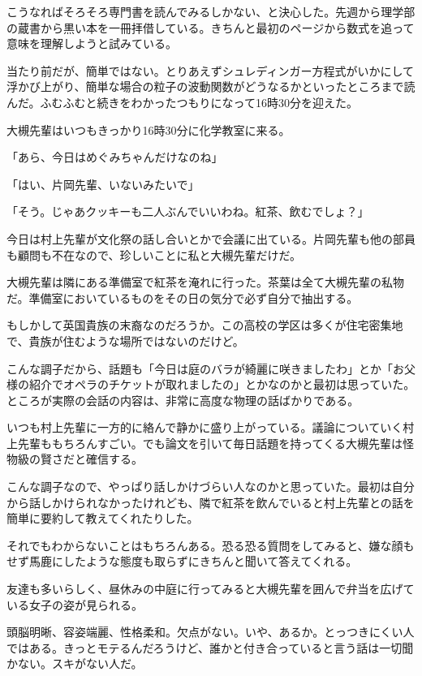 \documentclass[a4paper,dvipdfmx,12pt]{jsarticle}
\begin{document}
こうなればそろそろ専門書を読んでみるしかない、と決心した。先週から理学部の蔵書から黒い本を一冊拝借している。きちんと最初のページから数式を追って意味を理解しようと試みている。

当たり前だが、簡単ではない。とりあえずシュレディンガー方程式がいかにして浮かび上がり、簡単な場合の粒子の波動関数がどうなるかといったところまで読んだ。ふむふむと続きをわかったつもりになって16時30分を迎えた。

\vspace{0.2in}

大槻先輩はいつもきっかり16時30分に化学教室に来る。

「あら、今日はめぐみちゃんだけなのね」

「はい、片岡先輩、いないみたいで」

「そう。じゃあクッキーも二人ぶんでいいわね。紅茶、飲むでしょ？」

今日は村上先輩が文化祭の話し合いとかで会議に出ている。片岡先輩も他の部員も顧問も不在なので、珍しいことに私と大槻先輩だけだ。

\vspace{0.2in}

大槻先輩は隣にある準備室で紅茶を淹れに行った。茶葉は全て大槻先輩の私物だ。準備室においているものをその日の気分で必ず自分で抽出する。

もしかして英国貴族の末裔なのだろうか。この高校の学区は多くが住宅密集地で、貴族が住むような場所ではないのだけど。

こんな調子だから、話題も「今日は庭のバラが綺麗に咲きましたわ」とか「お父様の紹介でオペラのチケットが取れましたの」とかなのかと最初は思っていた。ところが実際の会話の内容は、非常に高度な物理の話ばかりである。

いつも村上先輩に一方的に絡んで静かに盛り上がっている。議論についていく村上先輩ももちろんすごい。でも論文を引いて毎日話題を持ってくる大槻先輩は怪物級の賢さだと確信する。

こんな調子なので、やっぱり話しかけづらい人なのかと思っていた。最初は自分から話しかけられなかったけれども、隣で紅茶を飲んでいると村上先輩との話を簡単に要約して教えてくれたりした。

それでもわからないことはもちろんある。恐る恐る質問をしてみると、嫌な顔もせず馬鹿にしたような態度も取らずにきちんと聞いて答えてくれる。

友達も多いらしく、昼休みの中庭に行ってみると大槻先輩を囲んで弁当を広げている女子の姿が見られる。

頭脳明晰、容姿端麗、性格柔和。欠点がない。いや、あるか。とっつきにくい人ではある。きっとモテるんだろうけど、誰かと付き合っていると言う話は一切聞かない。スキがない人だ。
\end{document}
